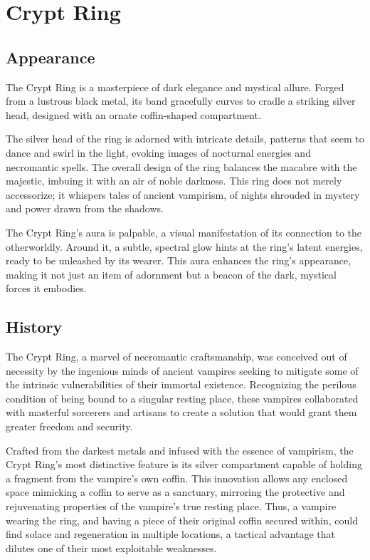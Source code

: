 
\chapter*{Crypt Ring}

\section*{Appearance}
The Crypt Ring is a masterpiece of dark elegance and mystical allure. Forged from a lustrous black metal, its band gracefully curves to cradle a striking silver head, designed with an ornate coffin-shaped compartment.

The silver head of the ring is adorned with intricate details, patterns that seem to dance and swirl in the light, evoking images of nocturnal energies and necromantic spells. The overall design of the ring balances the macabre with the majestic, imbuing it with an air of noble darkness. This ring does not merely accessorize; it whispers tales of ancient vampirism, of nights shrouded in mystery and power drawn from the shadows.

The Crypt Ring's aura is palpable, a visual manifestation of its connection to the otherworldly. Around it, a subtle, spectral glow hints at the ring's latent energies, ready to be unleashed by its wearer. This aura enhances the ring's appearance, making it not just an item of adornment but a beacon of the dark, mystical forces it embodies.

\eject

\section*{History}
The Crypt Ring, a marvel of necromantic craftsmanship, was conceived out of necessity by the ingenious minds of ancient vampires seeking to mitigate some of the intrinsic vulnerabilities of their immortal existence. Recognizing the perilous condition of being bound to a singular resting place, these vampires collaborated with masterful sorcerers and artisans to create a solution that would grant them greater freedom and security.

Crafted from the darkest metals and infused with the essence of vampirism, the Crypt Ring's most distinctive feature is its silver compartment capable of holding a fragment from the vampire's own coffin. This innovation allows any enclosed space mimicking a coffin to serve as a sanctuary, mirroring the protective and rejuvenating properties of the vampire's true resting place. Thus, a vampire wearing the ring, and having a piece of their original coffin secured within, could find solace and regeneration in multiple locations, a tactical advantage that dilutes one of their most exploitable weaknesses.

